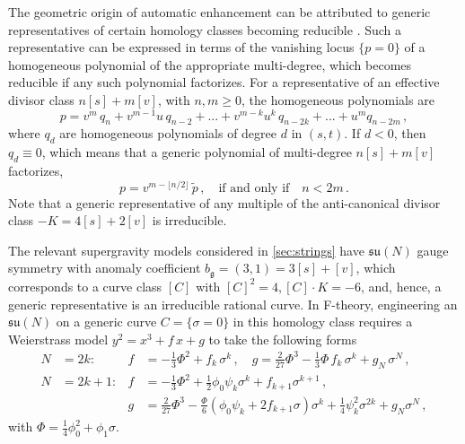 \documentclass[11pt, a4paper]{article}
\newcommand*{\fkg}{\ensuremath{\mathfrak{g}}}
\newcommand*{\fksu}{\ensuremath{\mathfrak{su}}}
\begin{document}
The geometric origin of automatic enhancement can be attributed to generic representatives of certain homology classes becoming reducible \cite{Raghuram:2020vxm}.
Such a representative can be expressed in terms of the vanishing locus $\{p=0\}$ of a homogeneous polynomial of the appropriate multi-degree, which becomes reducible if any such polynomial factorizes.
For a representative of an effective divisor class $n [s] + m [v]$, with $n,m \ge 0$, the homogeneous polynomials are
\begin{equation}
    p = v^{m} \, q_{n} + v^{m -1} u \, q_{n-2} + ... + v^{m-k} u^k \, q_{n-2k} + ... + u^m q_{n-2m} \, ,
\end{equation}
where $q_{d}$ are homogeneous polynomials of degree $d$ in $(s,t)$.
If $d<0$, then $q_d \equiv 0$, which means that a generic polynomial of multi-degree $n[s]+m[v]$ factorizes, 
\begin{equation}\label{eq:factorization_condition_on_F2}
    p = v^{m- \lfloor n/2 \rfloor} \, \tilde{p} \,, \quad \text{if and only if} \quad n < 2m \,.
\end{equation}
Note that a generic representative of any multiple of the anti-canonical divisor class $-K = 4[s] + 2[v]$ is irreducible.

The relevant supergravity models considered in \cref{sec:strings} have $\fksu(N)$ gauge symmetry with anomaly coefficient $b_\fkg = (3,1) = 3[s]+[v]$, which corresponds to a curve class $[C]$ with $[C]^2 = 4, [C] \cdot K = -6$, and, hence, a generic representative is an irreducible rational curve.
In F-theory, engineering an $\fksu(N)$ on a generic curve $C = \{\sigma=0\}$ in this homology class requires a Weierstrass model $y^2 = x^3 + f\,x+g$ to take the following forms \cite{Morrison:2011mb,Katz:2011qp}
\begin{equation}
    \begin{aligned}
        N & = 2k \colon & f &= -\frac13 \Phi^2 + f_k \,\sigma^k \, , \quad g = \frac{2}{27} \Phi^3 - \frac13 \Phi \, f_k \, \sigma^k + g_N \, \sigma^N \, , \\
        N & = 2k+1 \colon & f &= -\frac13 \Phi^2 + \frac12 \phi_0 \psi_k \sigma^k + f_{k+1} \sigma^{k+1} \, , \\
        & & g &= \frac{2}{27} \Phi^3 - \frac{\Phi}{6}(\phi_0 \psi_k + 2f_{k+1}\sigma) \sigma^k + \frac14 \psi_k^2 \sigma^{2k} + g_N \sigma^N \, ,
    \end{aligned}
\end{equation}
with $\Phi = \frac14 \phi_0^2 + \phi_1 \sigma$.
\end{document}
